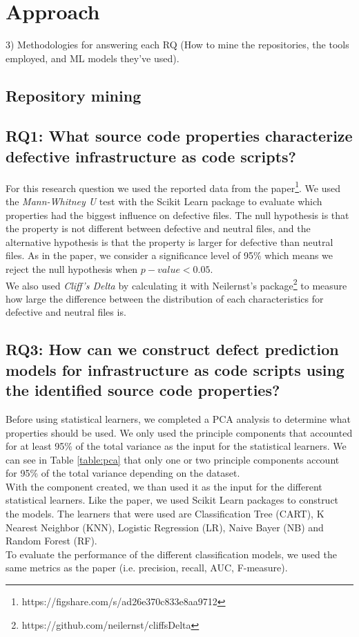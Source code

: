 
\section{Approach}
3) Methodologies for answering each RQ (How to mine the repositories, the tools employed, and ML models they've used).
\subsection{Repository mining}
\subsection{RQ1: What source code properties characterize defective infrastructure as code scripts?}
For this research question we used the reported data from the 
paper\footnote{https://figshare.com/s/ad26e370c833e8aa9712}.
We used the \emph{Mann-Whitney U} test with the Scikit Learn package
to evaluate which properties had the biggest influence on defective files. 
The null hypothesis is that the property is not different between defective and 
neutral files, and the alternative hypothesis is that the property is larger for 
defective than neutral files. As in the paper, we consider a significance level of 
95\% which means we reject the null hypothesis when $ p-value < 0.05 $. \\

We also used \emph{Cliff's Delta} by calculating it with Neilernst's package\footnote{https://github.com/neilernst/cliffsDelta}
to measure how large the difference between the distribution of each characteristics
for defective and neutral files is. 

\subsection{RQ3: How can we construct defect prediction models for 
infrastructure as code scripts using the identified source code properties?}
Before using statistical learners, we completed a PCA analysis to determine 
what properties should be used. We only used the principle components that accounted
for at least 95\% of the total variance as the input for the statistical learners.
We can see in Table \ref{table:pca} that only one or two principle components 
account for 95\% of the total variance depending on the dataset. \\

With the component created, we than used it as the input for the different
statistical learners. Like the paper, we used Scikit Learn packages to construct
the models. The learners that were used are Classification Tree (CART),
K Nearest Neighbor (KNN), Logistic Regression (LR), Naive Bayer (NB) and 
Random Forest (RF). \\

To evaluate the performance of the different classification models, we used the 
same metrics as the paper (i.e. precision, recall, AUC, F-measure).
